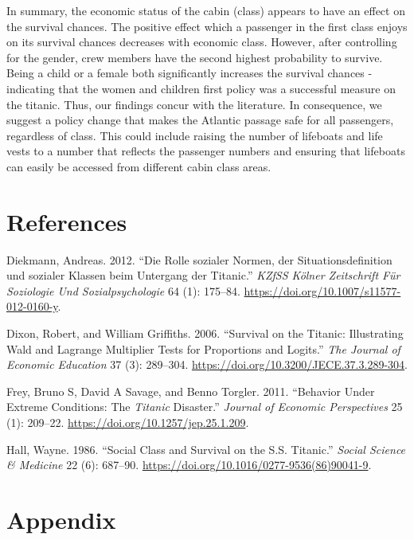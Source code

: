 \documentclass[
]{article}
\begin{document}
In summary, the economic status of the cabin (class) appears to have an
effect on the survival chances. The positive effect which a passenger in
the first class enjoys on its survival chances decreases with economic
class. However, after controlling for the gender, crew members have the
second highest probability to survive. Being a child or a female both
significantly increases the survival chances - indicating that the women
and children first policy was a successful measure on the titanic. Thus,
our findings concur with the literature. In consequence, we suggest a
policy change that makes the Atlantic passage safe for all passengers,
regardless of class. This could include raising the number of lifeboats
and life vests to a number that reflects the passenger numbers and
ensuring that lifeboats can easily be accessed from different cabin
class areas.

\newpage

\hypertarget{references}{%
\section{References}\label{references}}

\hypertarget{refs}{}
\leavevmode\hypertarget{ref-diekmann2012}{}%
Diekmann, Andreas. 2012. ``Die Rolle sozialer Normen, der
Situationsdefinition und sozialer Klassen beim Untergang der Titanic.''
\emph{KZfSS Kölner Zeitschrift Für Soziologie Und Sozialpsychologie} 64
(1): 175--84. \url{https://doi.org/10.1007/s11577-012-0160-y}.

\leavevmode\hypertarget{ref-dixon2006}{}%
Dixon, Robert, and William Griffiths. 2006. ``Survival on the Titanic:
Illustrating Wald and Lagrange Multiplier Tests for Proportions and
Logits.'' \emph{The Journal of Economic Education} 37 (3): 289--304.
\url{https://doi.org/10.3200/JECE.37.3.289-304}.

\leavevmode\hypertarget{ref-frey2011}{}%
Frey, Bruno S, David A Savage, and Benno Torgler. 2011. ``Behavior Under
Extreme Conditions: The \emph{Titanic} Disaster.'' \emph{Journal of
Economic Perspectives} 25 (1): 209--22.
\url{https://doi.org/10.1257/jep.25.1.209}.

\leavevmode\hypertarget{ref-hall1986}{}%
Hall, Wayne. 1986. ``Social Class and Survival on the S.S. Titanic.''
\emph{Social Science \& Medicine} 22 (6): 687--90.
\url{https://doi.org/10.1016/0277-9536(86)90041-9}.

\newpage

\hypertarget{appendix}{%
\section{Appendix}\label{appendix}}
\end{document}
